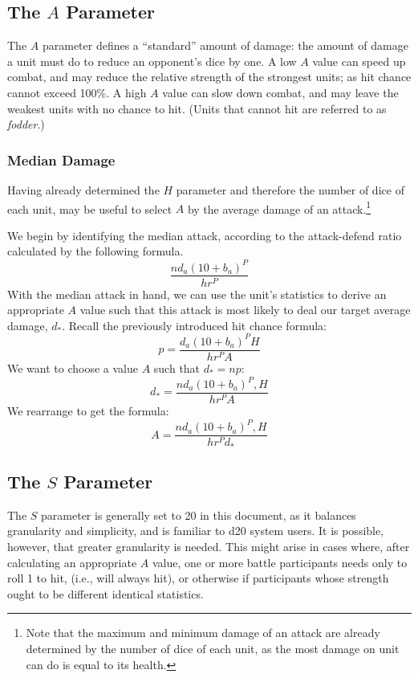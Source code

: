 
\subsection{The $A$ Parameter}

The $A$ parameter defines a ``standard'' amount of damage:
the amount of damage a unit must do to reduce an opponent's dice by one.
A low $A$ value can speed up combat,
and may reduce the relative strength of the strongest units;
as hit chance cannot exceed 100\%.
A high $A$ value can slow down combat,
and may leave the weakest units with no chance to hit.
(Units that cannot hit are referred to as \emph{fodder}.)

\subsubsection{Median Damage}

Having already determined the $H$ parameter and
therefore the number of dice of each unit,
may be useful to select $A$ by the average damage of an attack.\footnote{
    Note that the maximum and minimum damage of an attack
    are already determined by the number of dice of each unit,
    as the most damage on unit can do is equal to its health.
}

We begin by identifying the median attack,
according to the attack-defend ratio calculated by the following formula.
\[
    \frac
        {n d_a (10 + b_a)^P}
        {h r^P}
\]
With the median attack in hand,
we can use the unit's statistics to derive an appropriate $A$ value
such that this attack is most likely to deal our target average damage, $d_*$.
Recall the previously introduced hit chance formula:
\[
    p = \frac
        {d_a (10 + b_a)^P H}
        {h r^P A}
\]
We want to choose a value $A$ such that $d_* = n p$:
\[
    d_* = \frac
        {n d_a (10 + b_a)^P, H}
        {h r^P A}
\]
We rearrange to get the formula:
\[
    A = \frac
        {n d_a (10 + b_a)^P, H}
        {h r^P d_*}
\]


\subsection{The $S$ Parameter}
The $S$ parameter is generally set to 20 in this document,
as it balances granularity and simplicity,
and is familiar to d20 system users.
It is possible, however, that greater granularity is needed.
This might arise in cases where,
after calculating an appropriate $A$ value,
one or more battle participants needs only to roll 1 to hit,
(i.e., will always hit),
or otherwise if participants whose strength ought to be different
identical statistics.


